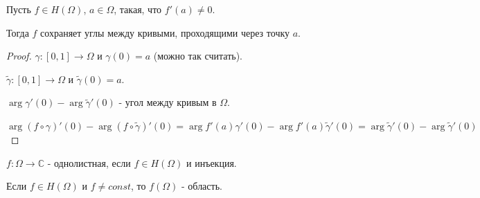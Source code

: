 \begin{theorem}
    Пусть $f \in H(\Omega)$, $a \in \Omega$, такая, что $f'(a) \neq 0$.

    Тогда $f$ сохраняет углы между кривыми, проходящими через точку $a$.
\end{theorem}

\begin{proof}
    $\gamma : [0, 1] \to \Omega$ и $\gamma (0) = a$ (можно так считать).

    $\tilde{\gamma} : [0, 1] \to \Omega$ и $\tilde{\gamma} (0) = a$.

    $\arg \gamma'(0) - \arg \tilde{\gamma}'(0)$ - угол между кривым в $\Omega$.

    $\arg (f \circ \gamma)'(0) - \arg (f \circ \tilde{\gamma})'(0) = \arg f'(a)\gamma'(0) - \arg f'(a) \tilde{\gamma}'(0) =
    \arg \tilde{\gamma}'(0) - \arg \tilde{\gamma}'(0)$
\end{proof}

\begin{definition}
    $f : \Omega \to \mathbb{C}$ - однолистная, если $f \in H(\Omega)$ и
    инъекция.
\end{definition}

\begin{theorem}
    Если $f \in H(\Omega)$ и $f \neq const$, то $f(\Omega)$ - область.
\end{theorem}

